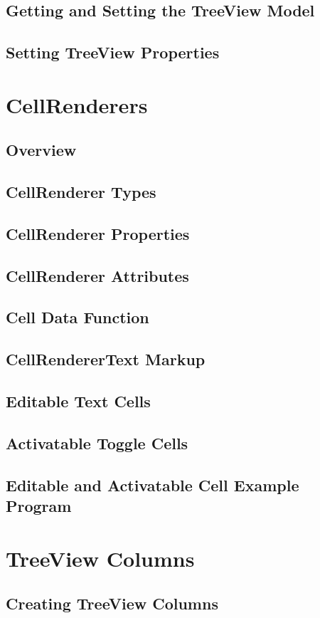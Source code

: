 \subsection{Getting and Setting the TreeView Model}
\subsection{Setting TreeView Properties}
\section{CellRenderers}
\subsection{Overview}
\subsection{CellRenderer Types}
\subsection{CellRenderer Properties}
\subsection{CellRenderer Attributes}
\subsection{Cell Data Function}
\subsection{CellRendererText Markup}
\subsection{Editable Text Cells}
\subsection{Activatable Toggle Cells}
\subsection{Editable and Activatable Cell Example Program}
\section{TreeView Columns}
\subsection{Creating TreeView Columns}
